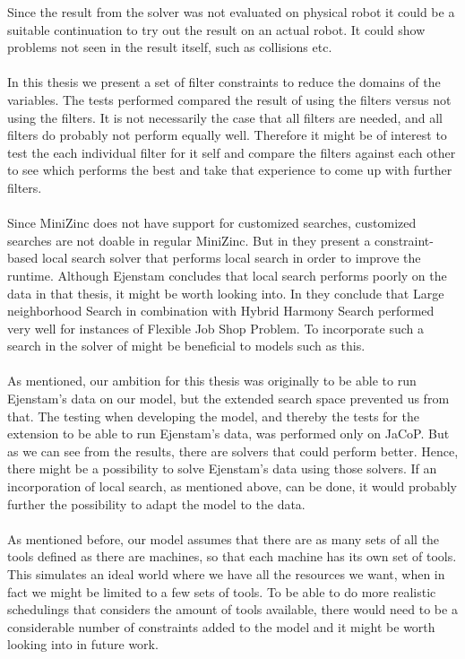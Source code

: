 Since the result from the solver was not evaluated on physical robot it could be a suitable continuation to try out the result on an actual robot. It could show problems not seen in the result itself, such as collisions etc.
\\\\
In this thesis we present a set of filter constraints to reduce the domains of the variables. The tests performed compared the result of using the filters versus not using the filters. It is not necessarily the case that all filters are needed, and all filters do probably not perform equally well. Therefore it might be of interest to test the each individual filter for it self and compare the filters against each other to see which performs the best and take that experience to come up with further filters.
\\\\
Since MiniZinc does not have support for customized searches, customized searches are not doable in regular MiniZinc. But in \cite{Bjordal} they present a constraint-based local search solver that performs local search in order to improve the runtime. Although Ejenstam concludes that local search performs poorly on the data in that thesis, it might be worth looking into. In \cite{yuan_2013} they conclude that Large neighborhood Search in combination with Hybrid Harmony Search performed very well for instances of Flexible Job Shop Problem. To incorporate such a search in the solver of \cite{Bjordal} might be beneficial to models such as this.
\\\\
As mentioned, our ambition for this thesis was originally to be able to run Ejenstam's data on our model, but the extended search space prevented us from that. The testing when developing the model, and thereby the tests for the extension to be able to run Ejenstam's data, was performed only on JaCoP. But as we can see from the results, there are solvers that could perform better. Hence, there might be a possibility to solve Ejenstam's data using those solvers. If an incorporation of local search, as mentioned above, can be done, it would probably further the possibility to adapt the model to the data.
\\\\
As mentioned before, our model assumes that there are as many sets of all the tools defined as there are machines, so that each machine has its own set of tools. This simulates an ideal world where we have all the resources we want, when in fact we might be limited to a few sets of tools. To be able to do more realistic schedulings that considers the amount of tools available, there would need to be a considerable number of constraints added to the model and it might be worth looking into in future work.
